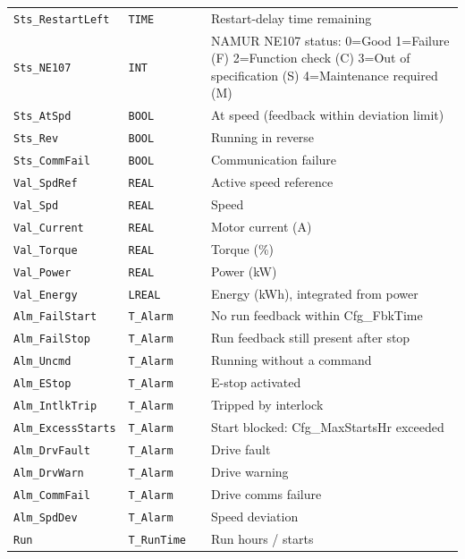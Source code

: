 \begin{small}
\begin{longtable}{@{}P{3.70cm}P{2.20cm}P{1.70cm}P{8.91cm}@{}}
\texttt{Sts\_RestartLeft} & \texttt{TIME} &  & Restart-delay time remaining \\
\texttt{Sts\_NE107} & \texttt{INT} &  & NAMUR NE107 status: 0=Good 1=Failure (F) 2=Function check (C) 3=Out of specification (S) 4=Maintenance required (M) \\
\texttt{Sts\_AtSpd} & \texttt{BOOL} &  & At speed (feedback within deviation limit) \\
\texttt{Sts\_Rev} & \texttt{BOOL} &  & Running in reverse \\
\texttt{Sts\_CommFail} & \texttt{BOOL} &  & Communication failure \\
\texttt{Val\_SpdRef} & \texttt{REAL} &  & Active speed reference \\
\texttt{Val\_Spd} & \texttt{REAL} &  & Speed \\
\texttt{Val\_Current} & \texttt{REAL} &  & Motor current (A) \\
\texttt{Val\_Torque} & \texttt{REAL} &  & Torque (\%) \\
\texttt{Val\_Power} & \texttt{REAL} &  & Power (kW) \\
\texttt{Val\_Energy} & \texttt{LREAL} &  & Energy (kWh), integrated from power \\
\texttt{Alm\_FailStart} & \texttt{T\_Alarm} &  & No run feedback within Cfg\_FbkTime \\
\texttt{Alm\_FailStop} & \texttt{T\_Alarm} &  & Run feedback still present after stop \\
\texttt{Alm\_Uncmd} & \texttt{T\_Alarm} &  & Running without a command \\
\texttt{Alm\_EStop} & \texttt{T\_Alarm} &  & E-stop activated \\
\texttt{Alm\_IntlkTrip} & \texttt{T\_Alarm} &  & Tripped by interlock \\
\texttt{Alm\_ExcessStarts} & \texttt{T\_Alarm} &  & Start blocked: Cfg\_MaxStartsHr exceeded \\
\texttt{Alm\_DrvFault} & \texttt{T\_Alarm} &  & Drive fault \\
\texttt{Alm\_DrvWarn} & \texttt{T\_Alarm} &  & Drive warning \\
\texttt{Alm\_CommFail} & \texttt{T\_Alarm} &  & Drive comms failure \\
\texttt{Alm\_SpdDev} & \texttt{T\_Alarm} &  & Speed deviation \\
\texttt{Run} & \texttt{T\_RunTime} &  & Run hours /\allowbreak{} starts \\
\bottomrule
\end{longtable}
\end{small}

